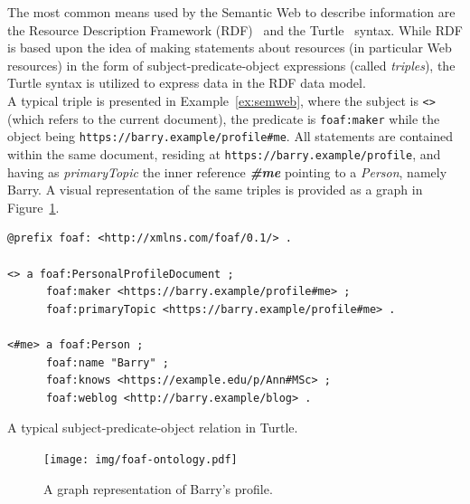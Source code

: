 The most common means used by the Semantic Web to describe information are the Resource Description Framework (RDF)~\cite{klyne2004resource} and the Turtle~\cite{beckett2008turtle} syntax. While RDF is based upon the idea of making statements about resources (in particular Web resources) in the form of subject-predicate-object expressions (called \textit{triples}), the Turtle syntax is utilized to express data in the RDF data model.\\

A typical triple is presented in Example~\ref{ex:semweb}, where the subject is \verb+<>+ (which refers to the current document), the predicate is \verb+foaf:maker+ while the object being \verb+https://barry.example/profile#me+. All statements are contained within the same document, residing at \verb+https://barry.example/profile+, and having as \textit{primaryTopic} the inner reference \textbf{\textit{\#me}} pointing to a \textit{Person}, namely Barry. A visual representation of the same triples is provided as a graph in Figure~\ref{fig:intro-foaf}.\\

\begin{example}
\begin{verbatim}
@prefix foaf: <http://xmlns.com/foaf/0.1/> .

<> a foaf:PersonalProfileDocument ;
      foaf:maker <https://barry.example/profile#me> ;
      foaf:primaryTopic <https://barry.example/profile#me> .

<#me> a foaf:Person ;
      foaf:name "Barry" ;
      foaf:knows <https://example.edu/p/Ann#MSc> ;
      foaf:weblog <http://barry.example/blog> .
\end{verbatim}
\caption{A typical subject-predicate-object relation in Turtle.}
\label{ex:semweb}
\end{example}

\begin{figure}[htbp]
  \begin{center}
    \texttt{[image: img/foaf-ontology.pdf]}
        \caption{A graph representation of Barry's profile.}
        \label{fig:intro-foaf}
  \end{center}
\end{figure}

